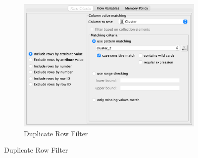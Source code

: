 \documentclass[11pt]{article}
\begin{document}
\begin{figure}[H]
\begin{subfigure}{0.4\textwidth}
					\includegraphics[width=\textwidth]{res/t1/t14/t14-row-filter-3-conf}
					\caption{Duplicate Row Filter}
					\label{fig:third}
				\end{subfigure}	
				\label{fig:figures}
			\end{figure}
			\fi
			
\end{document}
